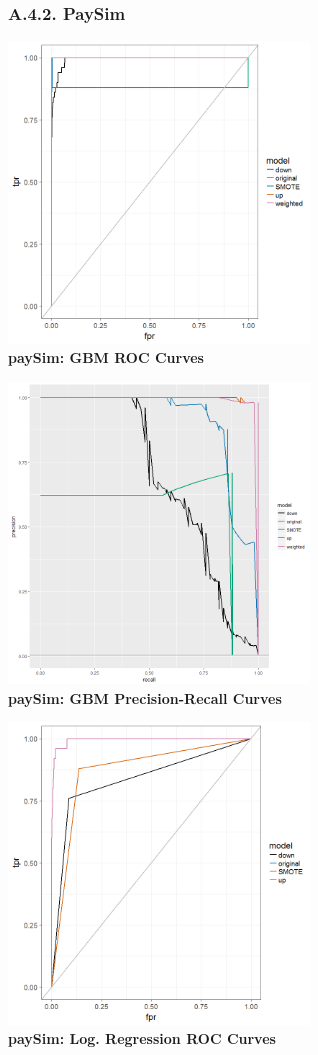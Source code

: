 \documentclass[12pt,]{article}
\begin{document}
\justify

\hypertarget{a.4.2.-paysim}{%
\subsubsection{A.4.2. PaySim}\label{a.4.2.-paysim}}

\center

\includegraphics[width=0.6\textwidth,height=\textheight]{figures/paysim/paySim_gbm_rocs.png}\\
\textbf{paySim: GBM ROC Curves}

\includegraphics[width=0.6\textwidth,height=\textheight]{figures/paysim/paySim_gbm_PR.png}\\
\textbf{paySim: GBM Precision-Recall Curves}

\includegraphics[width=0.6\textwidth,height=\textheight]{figures/paysim/paySim_glm_rocs.png}\\
\textbf{paySim: Log. Regression ROC Curves}
\end{document}
